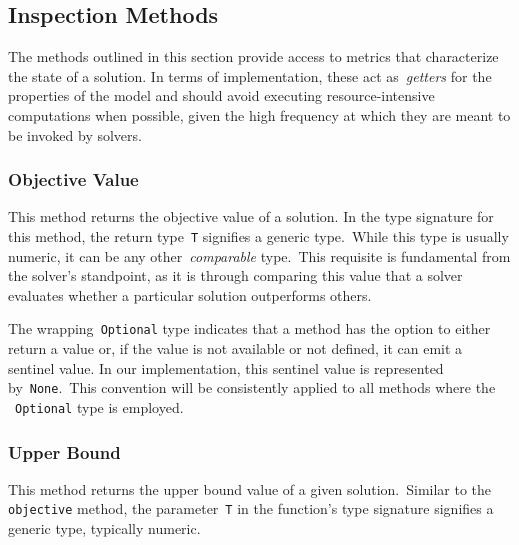 \subsection{Inspection Methods}

The methods outlined in this section provide access to metrics that characterize
the state of a solution. In terms of implementation, these
act as~\emph{getters} for the properties of the model and should avoid executing
resource-intensive computations when possible, given the high frequency at which
they are meant to be invoked by solvers.

\subsubsection*{Objective Value}

\begin{center}
\end{center}

This method returns the objective value of a solution. In the type signature for
this method, the return type~\texttt{T} signifies a generic type.~While this
type is usually numeric, it can be any other~\emph{comparable} type.~This
requisite is fundamental from the solver's standpoint, as it is through comparing
this value that a solver evaluates whether a particular solution outperforms
others.

The wrapping~\texttt{Optional} type indicates that a method has the option to
either return a value or, if the value is not available or not defined, it can
emit a sentinel value. In our implementation, this sentinel value is represented
by~\texttt{None}.~This convention will be consistently applied to all methods
where the ~\texttt{Optional} type is employed.

\subsubsection*{Upper Bound}

\begin{center}
\end{center}

This method returns the upper bound value of a given solution.~Similar to the
\texttt{objective} method, the parameter~\texttt{T} in the function's type
signature signifies a generic type, typically numeric.


